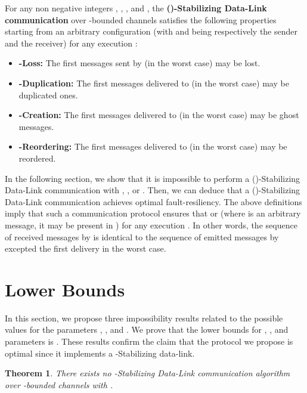 \documentclass[11pt]{article}
\newtheorem{theorem}{Theorem}
\begin{document}
For any non negative integers , , , and , the \textbf{()-Stabilizing Data-Link communication} over -bounded channels satisfies the following properties starting from an arbitrary configuration (with  and  being respectively the sender and the receiver) for any execution :
\begin{itemize}
\item \textbf{-Loss:} The first  messages sent by  (in the worst case) may be lost.

\item \textbf{-Duplication:} The first  messages delivered to  (in the worst case) may be duplicated ones.

\item \textbf{-Creation:} The first  messages delivered to  (in the worst case) may be ghost messages.

\item \textbf{-Reordering:} The first  messages delivered to  (in the worst case) may be reordered.

\end{itemize}

In the following section, we show that it is impossible to perform a ()-Stabilizing Data-Link communication with , , or . Then, we can deduce that a  ()-Stabilizing Data-Link communication achieves optimal fault-resiliency. The above definitions imply that such a communication protocol ensures that  or  (where  is an arbitrary message, it may be present in ) for any execution . In other words, the sequence of received messages by  is identical to the sequence of emitted messages by  excepted the first delivery in the worst case.

\section{Lower Bounds}\label{sec:impossibility}

In this section, we propose three impossibility results related to the possible values for the parameters , , and . We prove that the lower bounds for , , and  parameters is . These results confirm the claim that the protocol we propose is optimal since it implements a -Stabilizing data-link.

\begin{theorem}\label{th:impGamma}
There exists no -Stabilizing Data-Link communication algorithm over -bounded channels with .
\end{theorem}
\end{document}
